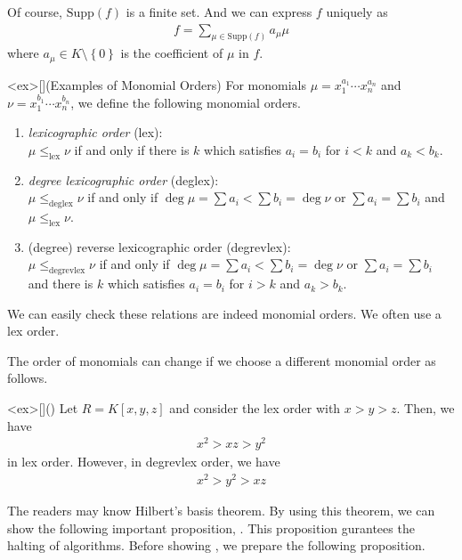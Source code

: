\documentclass{article}
\begin{document}
Of course, $\mathrm{Supp}(f)$ is a finite set. And we can express $f$ uniquely as
\begin{align}
    f = \sum_{\mu \in \mathrm{Supp}(f)} a_\mu \mu
\end{align}
where $a_\mu \in K \setminus \left\{ 0 \right\}$ is the coefficient of $\mu$ in $f$.

\begin{statementsp}<ex>[](Examples of Monomial Orders)
    For monomials $\mu = x_1^{a_1} \cdots x_n^{a_n}$ and $\nu = x_1^{b_1} \cdots x_n^{b_n}$, we define the following monomial orders.
    \begin{enumerate}
        \item \textit{lexicographic order} (lex): \\ $\mu \leq_{\mathrm{lex}} \nu$ if and only if there is $k$ which satisfies $a_i = b_i$ for $i < k$ and $a_k < b_k$.
        \item \textit{degree lexicographic order} (deglex): \\ $\mu \leq_{\mathrm{deglex}} \nu$ if and only if $\deg\mu = \sum a_i < \sum b_i = \deg\nu$ or $\sum a_i = \sum b_i$ and $\mu \leq_{\mathrm{lex}} \nu$.
        \item (degree) reverse lexicographic order (degrevlex): \\ $\mu \leq_{\mathrm{degrevlex}} \nu$ if and only if $\deg\mu = \sum a_i < \sum b_i = \deg\nu$ or $\sum a_i = \sum b_i$ and there is $k$ which satisfies $a_i = b_i$ for $i > k$ and $a_k > b_k$.
    \end{enumerate}
\end{statementsp}

We can easily check these relations are indeed monomial orders. We often use a lex order.

The order of monomials can change if we choose a different monomial order as follows.
\begin{statementsp}<ex>[]()
    Let $R = K[x,y,z]$ and consider the lex order with $x > y > z$. Then, we have
    \begin{align}
        x^2 > xz > y^2
    \end{align}
    in lex order. However, in degrevlex order, we have
    \begin{align}
        x^2 > y^2 > xz
    \end{align}
\end{statementsp}

The readers may know Hilbert's basis theorem. By using this theorem, we can show the following important proposition, . This proposition gurantees the halting of algorithms. Before showing , we prepare the following proposition.
\end{document}

